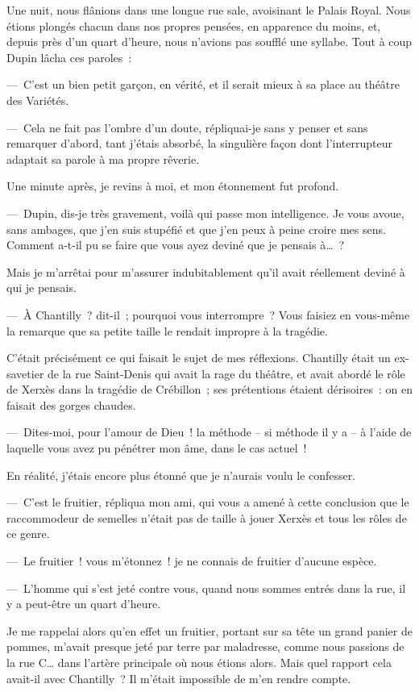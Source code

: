 \documentclass[french,twoside]{book} %
\begin{document}
Une nuit, nous flânions dans une longue rue sale, avoisinant le Palais Royal. Nous étions plongés chacun dans nos propres pensées, en apparence du moins, et, depuis près d’un quart d’heure, nous n’avions pas soufflé une syllabe. Tout à coup Dupin lâcha ces paroles :\par
— C’est un bien petit garçon, en vérité, et il serait mieux à sa place au théâtre des Variétés.\par
— Cela ne fait pas l’ombre d’un doute, répliquai-je sans y penser et sans remarquer d’abord, tant j’étais absorbé, la singulière façon dont l’interrupteur adaptait sa parole à ma propre rêverie.\par
Une minute après, je revins à moi, et mon étonnement fut profond.\par
— Dupin, dis-je très gravement, voilà qui passe mon intelligence. Je vous avoue, sans ambages, que j’en suis stupéfié et que j’en peux à peine croire mes sens. Comment a-t-il pu se faire que vous ayez deviné que je pensais à… ?\par
Mais je m’arrêtai pour m’assurer indubitablement qu’il avait réellement deviné à qui je pensais.\par
— À Chantilly ? dit-il ; pourquoi vous interrompre ? Vous faisiez en vous-même la remarque que sa petite taille le rendait impropre à la tragédie.\par
C’était précisément ce qui faisait le sujet de mes réflexions. Chantilly était un ex-savetier de la rue Saint-Denis qui avait la rage du théâtre, et avait abordé le rôle de Xerxès dans la tragédie de Crébillon ; ses prétentions étaient dérisoires : on en faisait des gorges chaudes.\par
— Dites-moi, pour l’amour de Dieu ! la méthode – si méthode il y a – à l’aide de laquelle vous avez pu pénétrer mon âme, dans le cas actuel !\par
En réalité, j’étais encore plus étonné que je n’aurais voulu le confesser.\par
— C’est le fruitier, répliqua mon ami, qui vous a amené à cette conclusion que le raccommodeur de semelles n’était pas de taille à jouer Xerxès et tous les rôles de ce genre.\par
— Le fruitier ! vous m’étonnez ! je ne connais de fruitier d’aucune espèce.\par
— L’homme qui s’est jeté contre vous, quand nous sommes entrés dans la rue, il y a peut-être un quart d’heure.\par
Je me rappelai alors qu’en effet un fruitier, portant sur sa tête un grand panier de pommes, m’avait presque jeté par terre par maladresse, comme nous passions de la rue C… dans l’artère principale où nous étions alors. Mais quel rapport cela avait-il avec Chantilly ? Il m’était impossible de m’en rendre compte.\par
\end{document}
